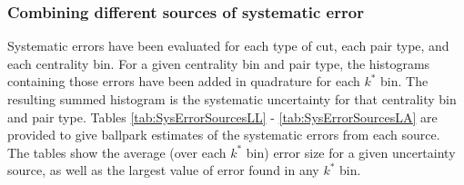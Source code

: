 %
%

\subsubsection{Combining different sources of systematic error}
\label{sec:CombiningSys}

Systematic errors have been evaluated for each type of cut, each pair type, and each centrality bin.  
For a given centrality bin and pair type, the histograms containing those errors have been added in quadrature for each $k^*$ bin.  
The resulting summed histogram is the systematic uncertainty for that centrality bin and pair type.  
Tables \ref{tab:SysErrorSourcesLL} - \ref{tab:SysErrorSourcesLA} are provided to give ballpark estimates of the systematic errors from each source.  
The tables show the average (over each $k^*$ bin) error size for a given uncertainty source, as well as the largest value of error found in any $k^*$ bin.

